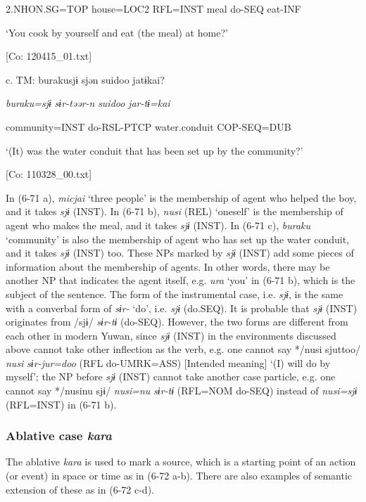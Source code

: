       2.NHON.SG=TOP  house=LOC2  RFL=INST  meal  do-SEQ  eat-INF

      ‘You cook by yourself and eat (the meal) at home?’

      [Co: 120415\_01.txt]

  c.  TM:  burakusjɨ  sjən  {\textbar}suidoo{\textbar}  jatɨkai?

      \textit{buraku=sjɨ}  \textit{sɨr-təər-n}  \textit{suidoo}  \textit{jar-tɨ=kai}

      community=INST  do-RSL-PTCP  water.conduit  COP-SEQ=DUB

      ‘(It) was the water conduit that has been set up by the community?’

      [Co: 110328\_00.txt]

In (6-71 a), \textit{micjai} ‘three people’ is the membership of agent who helped the boy, and it takes \textit{sjɨ} (INST). In (6-71 b), \textit{nusi} (REL) ‘oneself’ is the membership of agent who makes the meal, and it takes \textit{sjɨ} (INST). In (6-71 c), \textit{buraku} ‘community’ is also the membership of agent who has set up the water conduit, and it takes \textit{sjɨ} (INST) too. These NPs marked by \textit{sjɨ} (INST) add some pieces of information about the membership of agents. In other words, there may be another NP that indicates the agent itself, e.g. \textit{ura} ‘you’ in (6-71 b), which is the subject of the sentence. The form of the instrumental case, i.e. \textit{sjɨ}, is the same with a converbal form of \textit{sɨr-} ‘do’, i.e. \textit{sjɨ} (do.SEQ). It is probable that \textit{sjɨ} (INST) originates from /sjɨ/ \textit{sɨr-tɨ} (do-SEQ). However, the two forms are different from each other in modern Yuwan, since  \textit{sjɨ} (INST) in the environments discussed above cannot take other inflection as the verb, e.g. one cannot say */nusi sjuttoo/ \textit{nusi} \textit{sɨr-jur=doo} (RFL do-UMRK=ASS) [Intended meaning] ‘(I) will do by myself’;  the NP before \textit{sjɨ} (INST) cannot take another case particle, e.g. one cannot say */nusinu sjɨ/ \textit{nusi=nu} \textit{sɨr-tɨ} (RFL=NOM do-SEQ) instead of \textit{nusi=sjɨ} (RFL=INST) in (6-71 b).

\subsubsection{ Ablative case \textit{kara}}

The ablative \textit{kara} is used to mark a source, which is a starting point of an action (or event) in space or time as in (6-72 a-b). There are also examples of semantic extension of these as in (6-72 c-d).

